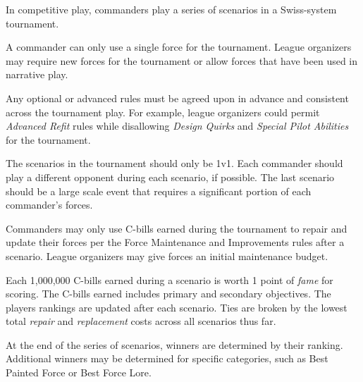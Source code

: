 In competitive play, commanders play a series of scenarios in a Swiss-system tournament.

A commander can only use a single force for the tournament.
League organizers may require new forces for the tournament or allow forces that have been used in narrative play.

Any optional or advanced rules must be agreed upon in advance and consistent across the tournament play.
For example, league organizers could permit \emph{Advanced Refit} rules while disallowing \emph{Design Quirks} and \emph{Special Pilot Abilities} for the tournament.

The scenarios in the tournament should only be 1v1.
Each commander should play a different opponent during each scenario, if possible.
The last scenario should be a large scale event that requires a significant portion of each commander's forces.

Commanders may only use C-bills earned during the tournament to repair and update their forces per the Force Maintenance and Improvements rules after a scenario.
League organizers may give forces an initial maintenance budget.

Each 1,000,000 C-bills earned during a scenario is worth 1 point of \emph{fame} for scoring.
The C-bills earned includes primary and secondary objectives.
The players rankings are updated after each scenario.
Ties are broken by the lowest total \emph{repair} and \emph{replacement} costs across all scenarios thus far.

At the end of the series of scenarios, winners are determined by their ranking.
Additional winners may be determined for specific categories, such as Best Painted Force or Best Force Lore.
